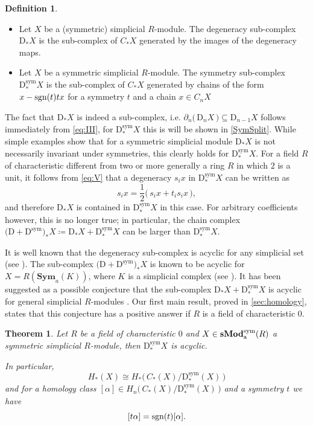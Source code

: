 \documentclass[12pt]{amsart}
\theoremstyle{plain}
\numberwithin{lemma}{\DefaultNumberTheoremWithin}
\numberwithin{claim}{\DefaultNumberTheoremWithin}
\newtheorem{theorem}{Theorem}
\numberwithin{theorem}{\DefaultNumberTheoremWithin}
\numberwithin{corollary}{\DefaultNumberTheoremWithin}
\numberwithin{proposition}{\DefaultNumberTheoremWithin}
\numberwithin{conjecture}{\DefaultNumberTheoremWithin}
\theoremstyle{definition}
\newtheorem*{definition}{Definition}
\theoremstyle{definition}
\numberwithin{question}{\DefaultNumberTheoremWithin}
\theoremstyle{definition}
\numberwithin{problem}{\DefaultNumberTheoremWithin}
\theoremstyle{remark}
\numberwithin{remark}{\DefaultNumberTheoremWithin}
\theoremstyle{remark}
\numberwithin{example}{\DefaultNumberTheoremWithin}
\def\blt{*}
\def\letbe{\coloneqq}
\def\sgn{\textnormal{sgn}}
\def\sym{\textnormal{sym}}
\def\Deg{\mathrm{D}}    %
\def\sDeg{\Deg^{\mathrm{sym}}}  %
\newcommand{\DpsD}[2]{\big(\Deg+\sDeg\big)_{#1} #2} %
\newcommand{\del}{\partial}
\newcommand{\sMod}[2]{\mathbf{sMod}_\textnormal{a}^{\textnormal{#1}}(#2)}  %
\newcommand{\firstappearence}[1]{{\sf #1}}
\begin{document}
\begin{definition}~
    \begin{itemize}
        \item[($\Deg$)]Let $X$ be a (symmetric) simplicial $R$-module. The \firstappearence{degeneracy sub-complex} $\Deg_\blt X$ is the sub-complex of $C_\blt X$ generated by the images of the degeneracy maps.
        \item[($\sDeg$)] Let $X$ be a symmetric simplicial $R$-module. The \firstappearence{symmetry sub-complex} $\sDeg_\blt X$ is the sub-complex of $C_\blt X$ generated by chains of the form $x-\sgn(t)tx$ for a symmetry $t$ and a chain $x\in C_n X$
    \end{itemize}
\end{definition}
The fact that $\Deg_\blt X$ is indeed a sub-complex, i.e. $\del_n\big(\, \Deg_n X \,\big)\subseteq \Deg_{n-1} X$ follows immediately from \eqref{eq:III}, for $\sDeg_\blt X$ this is will be shown in \ref{SymSplit}. While simple examples show that for a symmetric simplicial module $\Deg_\blt X$ is not necessarily invariant 
under symmetries, this clearly holds for $\sDeg_\blt X$. For a field $R$ of characteristic different from two or more generally a ring $R$ in which $2$ is a unit, it follows from \eqref{eq:V} that a degeneracy $s_ix$ in $\sDeg_\blt X$ can be written as
\[
s_ix=\frac{1}{2}\big(\,s_ix + t_is_ix\,\big),
\]
and therefore $\Deg_\blt X$ is contained in $\sDeg_\blt X$ in this case. For arbitrary coefficients however, this is no longer true; in particular, the chain complex $\DpsD{\blt}{X}\letbe \Deg_\blt X + \sDeg_\blt X$ can be larger than $\sDeg_\blt X$.


It is well known that the degeneracy sub-complex is acyclic for any simplicial set (see \cite[Proof of Theorem 8.3.8]{WeibelBook}). The sub-complex $\DpsD{\blt}{X}$ is known to be acyclic for $X= R(\mathbf{Sym}_a(K))$, where $K$ is a simplicial complex (see \cite[p. 173-176]{EilenbergSteenrodBook}). It has been suggested as a possible conjecture that the sub-complex $\Deg_\blt X + \sDeg_\blt X$ is acyclic for general simplicial $R$-modules \cite[first paragraph, p.59]{GodementBook}. 
Our first main result, proved in \ref{sec:homology}, states that this conjecture has a positive answer if $R$ is a field of characteristic $0$.

\begin{theorem}\label{mainSimp}
    Let $R$ be a field of characteristic $0$ and $X\in\sMod{\sym}{R}$ a symmetric simplicial $R$-module, 
    then $\sDeg_\blt X$ is acyclic.

    In particular, $$H_*(X) \cong H_*\big(\,C_*(X)/\sDeg_* (X)\,\big)$$ and
    for a homology class $[\alpha] \in H_n\big(\,C_*(X)/\sDeg_* (X)\,\big)$
    and a symmetry $t$ we have $$[t \alpha] = \sgn(t) [\alpha].$$ 
\end{theorem}
\end{document}
